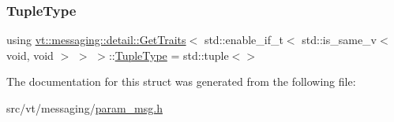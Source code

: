 \subsubsection{\texorpdfstring{Tuple\+Type}{TupleType}}
{\footnotesize\ttfamily using \hyperlink{structvt_1_1messaging_1_1detail_1_1_get_traits}{vt\+::messaging\+::detail\+::\+Get\+Traits}$<$ std\+::enable\+\_\+if\+\_\+t$<$ std\+::is\+\_\+same\+\_\+v$<$ void, void $>$ $>$ $>$\+::\hyperlink{structvt_1_1messaging_1_1detail_1_1_get_traits_3_01std_1_1enable__if__t_3_01std_1_1is__same__v_30a82890bb83a57326e36b60d2dd46a55_a5783166711a16c14431784b94e2d2d2f}{Tuple\+Type} =  std\+::tuple$<$$>$}



The documentation for this struct was generated from the following file\+:\begin{DoxyCompactItemize}
\item 
src/vt/messaging/\hyperlink{param__msg_8h}{param\+\_\+msg.\+h}\end{DoxyCompactItemize}
